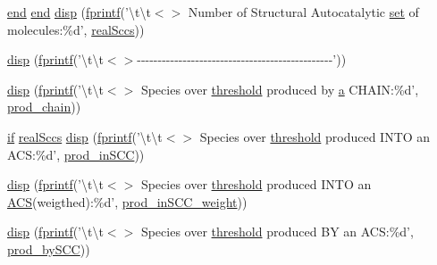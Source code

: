 \begin{DoxyCompactItemize}
\item 
\hyperlink{a00019_afb358f48b1646c750fb9da6c6585be2b}{end} \hyperlink{a00019_afb358f48b1646c750fb9da6c6585be2b}{end} \hyperlink{a00022_a00d6c60332efc3d721036c6f8283fa9b}{disp} (\hyperlink{a00062_aa6dc40efe43a338c9ff278260d95b4d9}{fprintf}('\textbackslash{}t\textbackslash{}t$<$$>$ Number of Structural Autocatalytic \hyperlink{a00022_ab178d77fe9330d344e5b21984e6dfd70}{set} of molecules\-:\%d', \hyperlink{a00022_a135a83e607075aa815c72f1ec0cbbc5a}{real\-Sccs}))
\item 
\hyperlink{a00022_afb873ef090cc25caaad4390f3b7bd082}{disp} (\hyperlink{a00062_aa6dc40efe43a338c9ff278260d95b4d9}{fprintf}('\textbackslash{}t\textbackslash{}t$<$$>$-\/-\/-\/-\/-\/-\/-\/-\/-\/-\/-\/-\/-\/-\/-\/-\/-\/-\/-\/-\/-\/-\/-\/-\/-\/-\/-\/-\/-\/-\/-\/-\/-\/-\/-\/-\/-\/-\/-\/-\/-\/-\/-\/-\/-\/-\/-\/'))
\item 
\hyperlink{a00022_a5fac2e70291daf3041076fa0a3db8d59}{disp} (\hyperlink{a00062_aa6dc40efe43a338c9ff278260d95b4d9}{fprintf}('\textbackslash{}t\textbackslash{}t$<$$>$ Species over \hyperlink{a00030_aa022cbb28f80299d572def08e7a5ccfd}{threshold} produced by \hyperlink{a00029_a2ffdbad9ea59541e59cbd2b938e0770c}{a} C\-H\-A\-I\-N\-:\%d', \hyperlink{a00022_ae0bd6421b7c81047a5234aeeb707efc4}{prod\-\_\-chain}))
\item 
\hyperlink{a00024_a01d55766b8058903dd360b4bda71f9f5}{if} \hyperlink{a00022_a135a83e607075aa815c72f1ec0cbbc5a}{real\-Sccs} \hyperlink{a00022_ab1110569ef2f575182b9d079880d5670}{disp} (\hyperlink{a00062_aa6dc40efe43a338c9ff278260d95b4d9}{fprintf}('\textbackslash{}t\textbackslash{}t$<$$>$ Species over \hyperlink{a00030_aa022cbb28f80299d572def08e7a5ccfd}{threshold} produced I\-N\-T\-O an A\-C\-S\-:\%d', \hyperlink{a00022_a4af96d327ccc28de3433ec07f61e2617}{prod\-\_\-in\-S\-C\-C}))
\item 
\hyperlink{a00022_a164a064f9fd091936d6c363b1cd39961}{disp} (\hyperlink{a00062_aa6dc40efe43a338c9ff278260d95b4d9}{fprintf}('\textbackslash{}t\textbackslash{}t$<$$>$ Species over \hyperlink{a00030_aa022cbb28f80299d572def08e7a5ccfd}{threshold} produced I\-N\-T\-O an \hyperlink{a00022_ad72e1068795c577213481e5db7f3e925}{A\-C\-S}(weigthed)\-:\%d', \hyperlink{a00022_aeb0c708cea53f4ecbc2e1a8fad331f3b}{prod\-\_\-in\-S\-C\-C\-\_\-weight}))
\item 
\hyperlink{a00022_aa3bb00171c284f890c21d053aea2b615}{disp} (\hyperlink{a00062_aa6dc40efe43a338c9ff278260d95b4d9}{fprintf}('\textbackslash{}t\textbackslash{}t$<$$>$ Species over \hyperlink{a00030_aa022cbb28f80299d572def08e7a5ccfd}{threshold} produced B\-Y an A\-C\-S\-:\%d', \hyperlink{a00022_a9c39bd233d632a4392a969b0ba0ac2bd}{prod\-\_\-by\-S\-C\-C}))

\end{DoxyCompactItemize}
